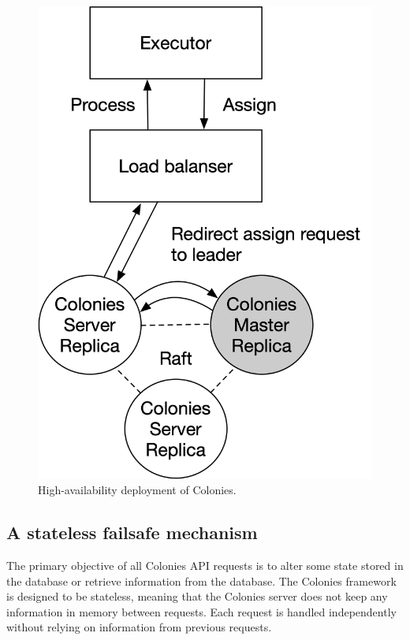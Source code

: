 \documentclass{article}
\begin{document}
\begin{figure}[h]
	\centering
    \includegraphics[scale=0.6]{raft.png}
	\caption{High-availability deployment of Colonies.}
	\label{fig:ha_deployment}
\end{figure}

\subsection{A stateless failsafe mechanism}
\label{stateless_error_management}
The primary objective of all Colonies API requests is to alter some state stored in the database or retrieve information from the database. The Colonies framework is designed to be stateless, meaning that the Colonies server does not keep any information in memory between requests. Each request is handled independently without relying on information from previous requests. 
\end{document}
